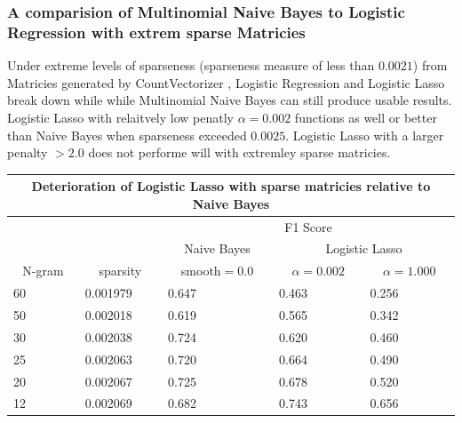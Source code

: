 \documentclass[11pt]{article}
\begin{document}
{\subsubsection{A comparision of Multinomial Naive Bayes to Logistic Regression with extrem sparse Matricies}
Under extreme levels of sparseness (sparseness measure of less than $0.0021$) from  Matricies 
generated by CountVectorizer , Logistic Regression and Logistic Lasso break down while
while Multinomial Naive Bayes can still produce usable results. Logistic Lasso with relaitvely low penatly 
$\alpha=0.002$ functions as well or better than Naive Bayes when sparseness exceeded $0.0025$.
Logistic Lasso with a larger penalty $> 2.0$ does not performe will with extremley sparse matricies. \\

\noindent \begin{tabular}{ |p{2cm}||p{2cm}|p{2cm}|p{2cm}|p{2cm}|  }
 \hline

 \multicolumn{5}{|c|}{Deterioration of Logistic Lasso with sparse matricies relative to Naive Bayes} \\
 \hline
 \multicolumn{1}{|c|}{} &
 \multicolumn{1}{|c|}{} &
 \multicolumn{3}{|c|}{F1 Score} \\

 \hline
 \multicolumn{1}{|c|}{} &
 \multicolumn{1}{|c|}{} &
 \multicolumn{1}{|c|}{Naive Bayes} &
 \multicolumn{2}{|c|}{Logistic Lasso} \\

 \hline
 \multicolumn{1}{|c|}{N-gram} &
 \multicolumn{1}{|c|}{sparsity} &
 \multicolumn{1}{|c|}{smooth$=0.0$} &
 \multicolumn{1}{|c|}{$\alpha=0.002$} &
 \multicolumn{1}{|c|}{$\alpha=1.000$} \\
 \hline
 60& 0.001979 & 0.647 & 0.463 & 0.256\\
 50& 0.002018 & 0.619 & 0.565 & 0.342\\
 30& 0.002038 & 0.724 & 0.620 & 0.460\\
 25& 0.002063 & 0.720 & 0.664 & 0.490\\
 20& 0.002067 & 0.725 & 0.678 & 0.520\\
 12& 0.002069 & 0.682 & 0.743 & 0.656\\
 \hline
\end{tabular}




}
\end{document}
